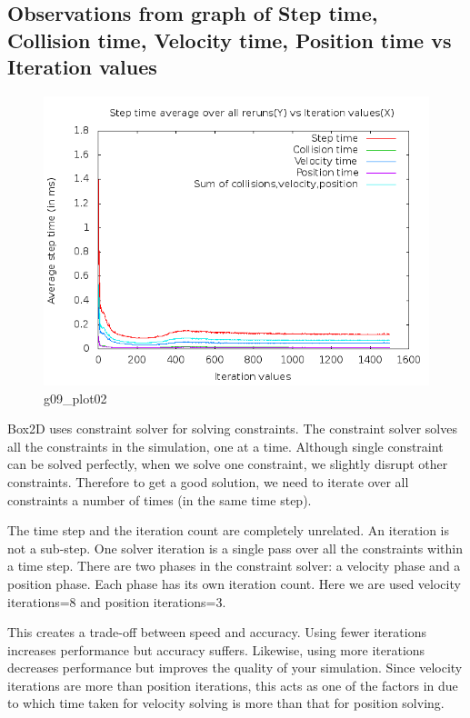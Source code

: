 \documentclass[11pt,english]{article}
\begin{document}
\subsection{Observations from graph of Step time, Collision time, Velocity time, Position time vs Iteration values}
\begin{figure}[h!]
\centering
\includegraphics[scale=.45]{g09_plot02.png}
\caption{g09\_plot02}
\end{figure}
\indent 
\par{Box2D uses constraint solver for solving constraints. The constraint solver solves all the constraints in the simulation, one at a time. Although single constraint can be solved perfectly, when we solve one constraint, we slightly disrupt other constraints. Therefore to get a good solution, we need to iterate over all constraints a number of times (in the same time step).}

\indent 
\par{The time step and the iteration count are completely unrelated. An iteration is not a sub-step. One solver iteration is a single pass over all the constraints within a time step.
There are two phases in the constraint solver: a velocity phase and a position phase. Each phase has its own iteration count. Here we are used velocity iterations=8 and position iterations=3.}

\indent 
\par{This creates a trade-off between speed and accuracy. Using fewer iterations increases performance but accuracy suffers. Likewise, using more iterations decreases performance but improves the quality of your simulation. Since velocity iterations are more than position iterations, this acts as one of the factors in due to which time taken for velocity solving is more than that for position solving.}
\end{document}
